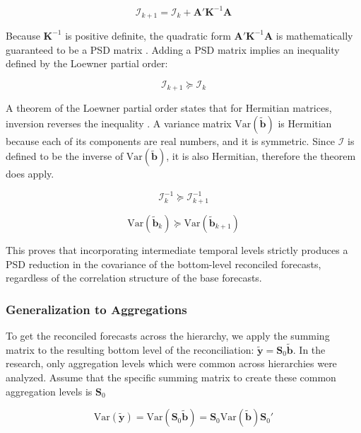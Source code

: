 \documentclass[sn-basic,Numbered,iicol]{sn-jnl}
\theoremstyle{thmstyleone}%
\theoremstyle{thmstyletwo}%
\theoremstyle{thmstylethree}%
\begin{document}
\begin{equation}\label{eq:core}
\mathcal{I}_{k+1}=\mathcal{I}_k+\mathbf{A}'\mathbf{K}^{-1}\mathbf{A}
\end{equation}

Because $\mathbf{K}^{-1}$ is positive definite, the quadratic form $\mathbf{A}'\mathbf{K}^{-1}\mathbf{A}$ is mathematically guaranteed to be a PSD matrix \cite{sebermatrix}. Adding a PSD matrix implies an inequality defined by the Loewner partial order:

\begin{equation}
\mathcal{I}_{k+1}\succeq\mathcal{I}_k
\end{equation}

A theorem of the Loewner partial order states that for Hermitian matrices, inversion reverses the inequality \cite{sebermatrix}. A variance matrix $\text{Var}(\tilde{\mathbf{b}})$ is Hermitian because each of its components are real numbers, and it is symmetric. Since $\mathcal{I}$ is defined to be the inverse of $\text{Var}(\tilde{\mathbf{b}})$, it is also Hermitian, therefore the theorem does apply.

\begin{equation}
\mathcal{I}_k^{-1}\succeq\mathcal{I}_{k+1}^{-1}
\end{equation}

\begin{equation}
\text{Var}(\tilde{\mathbf{b}}_k)\succeq\text{Var}(\tilde{\mathbf{b}}_{k+1})
\end{equation}

This proves that incorporating intermediate temporal levels strictly produces a PSD reduction in the covariance of the bottom-level reconciled forecasts, regardless of the correlation structure of the base forecasts.

\subsubsection{Generalization to Aggregations}\label{subsubsec:generalization}

To get the reconciled forecasts across the hierarchy, we apply the summing matrix to the resulting bottom level of the reconciliation: $\tilde{\mathbf{y}}=\mathbf{S}_0\tilde{\mathbf{b}}$. In the research, only aggregation levels which were common across hierarchies were analyzed. Assume that the specific summing matrix to create these common aggregation levels is $\mathbf{S}_0$

\begin{equation}
\text{Var}(\tilde{\mathbf{y}}) = \text{Var}(\mathbf{S}_0\tilde{\mathbf{b}}) = \mathbf{S}_0 \text{Var}(\tilde{\mathbf{b}}) \mathbf{S}_0'
\end{equation}
\end{document}

